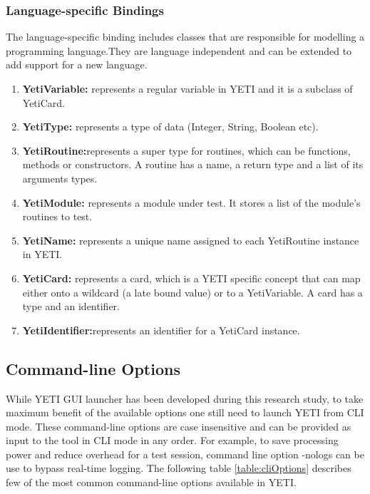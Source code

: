 \subsubsection{Language-specific Bindings}
The language-specific binding includes classes that are responsible for modelling a programming language.They are language independent and can be extended to add support for a new language.
\begin{enumerate}
\item {\textbf{YetiVariable:}} represents a regular variable in YETI and it is a subclass of YetiCard.
\item {\textbf{YetiType:}} represents a type of data (Integer, String, Boolean etc).
\item {\textbf{YetiRoutine:}}represents a super type for routines, which can be functions, methods or constructors. A routine has a name, a return type and a list of its arguments types.
\item {\textbf{YetiModule:}} represents a module under test. It stores a list of the module’s routines to test. 
\item {\textbf{YetiName:}} represents a unique name assigned to each YetiRoutine instance in YETI.
\item {\textbf{YetiCard:}} represents a card, which is a YETI specific concept that can map either onto a wildcard (a late bound value) or to a YetiVariable. A card has a type and an identifier.
\item {\textbf{YetiIdentifier:}}represents an identifier for a YetiCard instance.
\end{enumerate}

\subsection{Command-line Options}
While YETI GUI launcher has been developed during this research study, to take maximum benefit of the available options one still need to launch YETI from CLI mode. These command-line options are case insensitive and can be provided as input to the tool in CLI mode in any order. For example, to save processing power and reduce overhead for a test session, command line option -nologs can be use to bypass real-time logging. The following table \ref{table:cliOptions} describes few of the most common command-line options available in YETI. 


